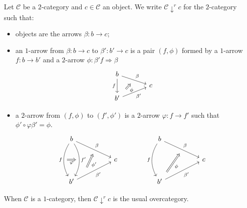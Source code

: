 \documentclass[a4paper,10pt
,draft
]{article}%
\renewcommand{\1}{\eta}%
\begin{document}
\begin{definition}
Let $\mathcal{C}$ be a $2$-category and $c \in \mathcal{C}$ an object.
We write $\mathcal{C} \downarrow^r c$ for the $2$-category such that:
\begin{itemize}
	\item objects are the arrows $\beta \colon b \to c$;
	\item an $1$-arrow from 
	$\beta \colon b \to c$
	to
	$\beta' \colon b' \to c$ 
	is a pair $(f,\phi)$
	formed by a $1$-arrow $f\colon b \to b'$ and a $2$-arrow
	$\phi \colon \beta' f \Rightarrow \beta$
		\begin{equation}
		\begin{tikzcd}[row sep = tiny, column sep = 35pt]
			b \arrow{dr}[name=U]{\beta} \arrow{dd}[swap]{f}
		\\
			& c
		\\
			|[alias=V]| b' \arrow{ur}[swap]{\beta'}
		\arrow[Rightarrow, from=V, to=U,shorten >=0.25cm,shorten <=0.25cm
		,swap,"\phi"
		]
		\end{tikzcd}
		\end{equation}
	\item a $2$-arrow from $(f,\phi)$ to $(f',\phi')$ is a $2$-arrow $\varphi \colon f \to f'$ such that
	$\phi' \circ \varphi \beta' = \phi$.
		\begin{equation}
		\begin{tikzcd}[column sep = 50pt]
			b \arrow{dr}[name=U]{\beta} 
			\arrow[bend right]{dd}[swap]{f}[name=F]{}
			\arrow[bend left]{dd}{f'}[swap,name=FF]{}
			&
		&
			b \arrow{dr}[name=U2]{\beta} 
			\arrow[bend right]{dd}[swap]{f}
			&
		\\
			& c
		&
			& c
		\\
			b' \arrow{ur}[swap]{\beta'}[near start, name=V]{}
			&
		&
			|[alias=V2]| b' \arrow{ur}[swap]{\beta'}
			&
		\arrow[Rightarrow, from=V, to=U,shorten >=0.25cm,shorten <=0.25cm
		,swap,"\phi'"
		]
		\arrow[Rightarrow, from=F, to=FF,shorten >=0.0cm,shorten <=0.0cm
		,swap,"\varphi"
		]
		\arrow[Rightarrow, from=V2, to=U2,shorten >=0.25cm,shorten <=0.25cm
		,swap,"\phi"
		]
		\end{tikzcd}
		\end{equation}
\end{itemize}
\end{definition}

\begin{example}
When $\mathcal{C}$ is a $1$-category, then 
$\mathcal{C} \downarrow^r c$ is the usual overcategory.
\end{example}
\end{document}
